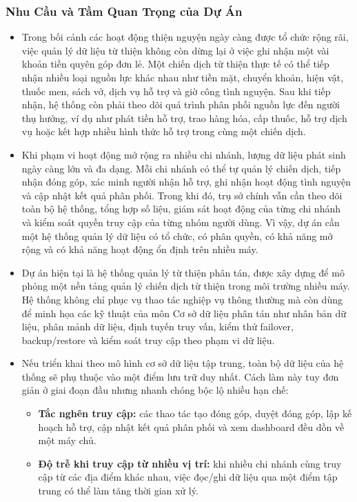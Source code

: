 \documentclass[12pt,a4paper]{article}
\begin{document}
\subsubsection{Nhu Cầu và Tầm Quan Trọng của Dự Án}
\begin{itemize}
\item Trong bối cảnh các hoạt động thiện nguyện ngày càng được tổ chức rộng rãi, việc quản lý dữ liệu từ thiện không còn dừng lại ở việc ghi nhận một vài khoản tiền quyên góp đơn lẻ. Một chiến dịch từ thiện thực tế có thể tiếp nhận nhiều loại nguồn lực khác nhau như tiền mặt, chuyển khoản, hiện vật, thuốc men, sách vở, dịch vụ hỗ trợ và giờ công tình nguyện. Sau khi tiếp nhận, hệ thống còn phải theo dõi quá trình phân phối nguồn lực đến người thụ hưởng, ví dụ như phát tiền hỗ trợ, trao hàng hóa, cấp thuốc, hỗ trợ dịch vụ hoặc kết hợp nhiều hình thức hỗ trợ trong cùng một chiến dịch.
\item Khi phạm vi hoạt động mở rộng ra nhiều chi nhánh, lượng dữ liệu phát sinh ngày càng lớn và đa dạng. Mỗi chi nhánh có thể tự quản lý chiến dịch, tiếp nhận đóng góp, xác minh người nhận hỗ trợ, ghi nhận hoạt động tình nguyện và cập nhật kết quả phân phối. Trong khi đó, trụ sở chính vẫn cần theo dõi toàn bộ hệ thống, tổng hợp số liệu, giám sát hoạt động của từng chi nhánh và kiểm soát quyền truy cập của từng nhóm người dùng. Vì vậy, dự án cần một hệ thống quản lý dữ liệu có tổ chức, có phân quyền, có khả năng mở rộng và có khả năng hoạt động ổn định trên nhiều máy.
\item Dự án hiện tại là hệ thống quản lý từ thiện phân tán, được xây dựng để mô phỏng một nền tảng quản lý chiến dịch từ thiện trong môi trường nhiều máy. Hệ thống không chỉ phục vụ thao tác nghiệp vụ thông thường mà còn dùng để minh họa các kỹ thuật của môn Cơ sở dữ liệu phân tán như nhân bản dữ liệu, phân mảnh dữ liệu, định tuyến truy vấn, kiểm thử failover, backup/restore và kiểm soát truy cập theo phạm vi dữ liệu.
\item Nếu triển khai theo mô hình cơ sở dữ liệu tập trung, toàn bộ dữ liệu của hệ thống sẽ phụ thuộc vào một điểm lưu trữ duy nhất. Cách làm này tuy đơn giản ở giai đoạn đầu nhưng nhanh chóng bộc lộ nhiều hạn chế:
\begin{itemize}
\item \textbf{Tắc nghẽn truy cập:} các thao tác tạo đóng góp, duyệt đóng góp, lập kế hoạch hỗ trợ, cập nhật kết quả phân phối và xem dashboard đều dồn về một máy chủ.
\item \textbf{Độ trễ khi truy cập từ nhiều vị trí:} khi nhiều chi nhánh cùng truy cập từ các địa điểm khác nhau, việc đọc/ghi dữ liệu qua một điểm tập trung có thể làm tăng thời gian xử lý.

\end{itemize}
\end{itemize}
\end{document}
